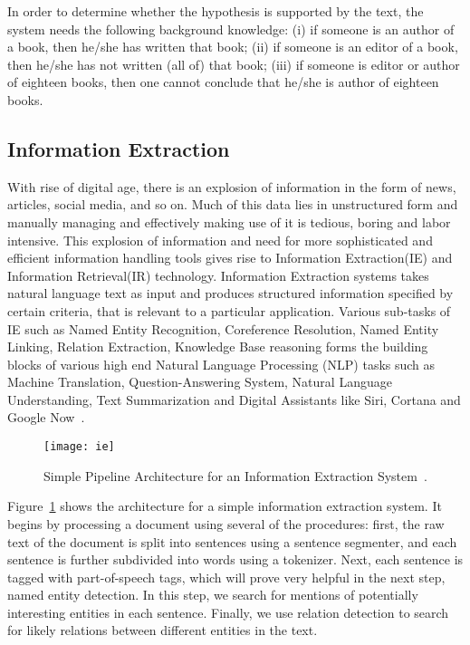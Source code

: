 In order to determine whether the hypothesis is supported by the text, the system needs the following background knowledge: (i) if someone is an author of a book, then he/she has written that book; (ii) if someone is an editor of a book, then he/she has not written (all of) that book; (iii) if someone is editor or author of eighteen books, then one cannot conclude that he/she is author of eighteen books.

\subsection{Information Extraction}
With rise of digital age, there is an explosion of information in the form of news, articles, social media, and so on. Much of this data lies in unstructured form and manually managing and effectively making use of it is tedious, boring and labor intensive. This explosion of information and need for more sophisticated and efficient information handling tools gives rise to Information Extraction(IE) and Information Retrieval(IR) technology. Information Extraction systems takes natural language text as input and produces structured information specified by certain criteria, that is relevant to a particular application. Various sub-tasks of IE such as Named Entity Recognition, Coreference Resolution, Named Entity Linking, Relation Extraction, Knowledge Base reasoning forms the building blocks of various high end Natural Language Processing (NLP) tasks such as Machine Translation, Question-Answering System, Natural Language Understanding, Text Summarization and Digital Assistants like Siri, Cortana and Google Now~\cite{DBLP:journals/corr/abs-1807-02383}.
\begin{figure}[htbp]
    \centering
    \texttt{[image: ie]}
    \caption{Simple Pipeline Architecture for an Information Extraction System~\cite{DBLP:journals/corr/abs-1807-02383}.}
    \label{fig:2}
\end{figure}

Figure~\ref{fig:2} shows the architecture for a simple information extraction system. It begins by processing a document using several of the procedures: first, the raw text of the document is split into sentences using a sentence segmenter, and each sentence is further subdivided into words using a tokenizer. Next, each sentence is tagged with part-of-speech tags, which will prove very helpful in the next step, named entity detection. In this step, we search for mentions of potentially interesting entities in each sentence. Finally, we use relation detection to search for likely relations between different entities in the text.
